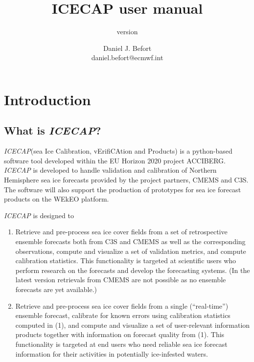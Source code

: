 \documentclass[DIV=10, parskip=full]{scrreprt}
\title{ICECAP user manual}
\subtitle{version \version}
\author{Daniel J. Befort \\ daniel.befort@ecmwf.int}
\newcommand{\ice}{\textit{ICECAP}\xspace}
\newcommand{\notimplement}[1]{#1}
\begin{document}
\maketitle

\tableofcontents

\chapter{Introduction}

\section{What is \ice?}
\ice (sea Ice Calibration, vErifiCAtion and Products) is a python-based software tool developed within the EU Horizon 2020 project ACCIBERG. \ice is developed to handle validation and calibration of Northern Hemisphere sea ice forecasts provided by the project partners, CMEMS and C3S. The software will also support the production of prototypes for sea ice forecast products on the WEkEO platform. 

\ice is designed to 
\begin{enumerate}
	\item Retrieve and pre-process sea ice cover fields from a set of retrospective ensemble forecasts both from C3S and CMEMS as well as the corresponding observations, compute and visualize a set of validation metrics, and compute calibration statistics. This functionality is targeted at scientific users who perform research on the forecasts and develop the forecasting systems. \notimplement{(In the latest version retrievals from CMEMS are not  possible as no ensemble forecasts are yet available.)}
	\item Retrieve and pre-process sea ice cover fields from a single (“real-time”) ensemble forecast, calibrate for known errors using calibration statistics computed in (1), and compute and visualize a set of user-relevant information products together with information on forecast quality from (1). This functionality is targeted at end users who need reliable sea ice forecast information for their activities in potentially ice-infested waters.
\end{enumerate}
\end{document}
